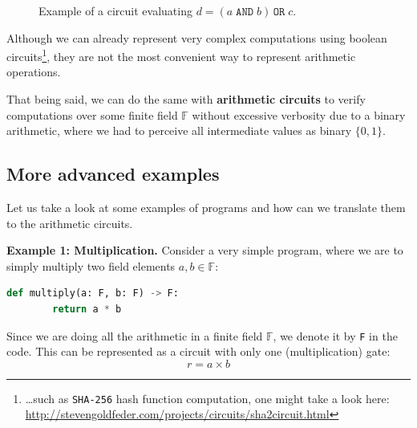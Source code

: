 \documentclass[../lecture-notes.tex]{subfiles}
\begin{document}
\begin{figure}[h!]
    \centering
    \caption{Example of a circuit evaluating $d = (a \;\texttt{AND}\; b) \,\texttt{OR}\; c$.}
    \label{fig:bool-circuit}
\end{figure}

Although we can already represent very complex computations using boolean circuits\footnote{\ldots such as \texttt{SHA-256} hash function computation, one might take a look here: \url{http://stevengoldfeder.com/projects/circuits/sha2circuit.html}}, they are not the most convenient way to represent arithmetic operations. 

That being said, we can do the same with \textbf{arithmetic circuits} to verify computations over some finite field $\mathbb{F}$ without excessive 
verbosity due to a binary arithmetic, where we had to perceive all intermediate
values as binary $\{0,1\}$.

\subsection{More advanced examples}

Let us take a look at some examples of programs and how can we translate them to the arithmetic
circuits. 

\textbf{Example 1: Multiplication.} Consider a very simple program, where we are to simply multiply two field elements $a,b \in \mathbb{F}$:

\begin{lstlisting}[language=Python,numbers=none]
    def multiply(a: F, b: F) -> F:
        return a * b
\end{lstlisting}

Since we are doing all the arithmetic in a finite field $\mathbb{F}$, we denote it by \texttt{F} in the code. This can be represented as a circuit with only one (multiplication) gate:
\begin{equation*}
    r = a \times b
\end{equation*}    
\end{document}
